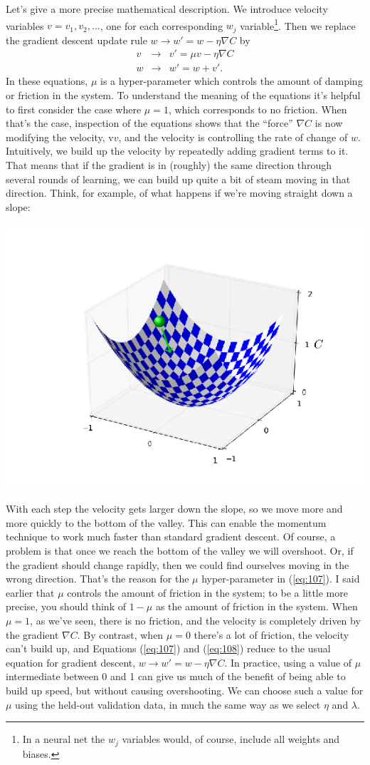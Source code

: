 \documentclass[a4paper,twoside,10pt]{book}
\begin{document}
Let's give a more precise mathematical description. We introduce velocity variables $v=v_1,v_2,\ldots$, one for each corresponding $w_j$ variable\footnote{In a neural net the $w_j$ variables would, of course, include all weights and biases.}. Then we replace the gradient descent update rule $w \to w'= w-\eta \nabla C$ by
\begin{eqnarray} 
v & \to  & v' = \mu v - \eta \nabla C \label{eq:107}\\
w & \to & w' = w+v'.\label{eq:108}
\end{eqnarray}
In these equations, $\mu$ is a hyper-parameter which controls the amount of damping or friction in the system. To understand the meaning of the equations it's helpful to first consider the case where $\mu=1$, which corresponds to no friction. When that's the case, inspection of the equations shows that the ``force'' $\nabla C$ is now modifying the velocity, v$v$, and the velocity is controlling the rate of change of $w$. Intuitively, we build up the velocity by repeatedly adding gradient terms to it. That means that if the gradient is in (roughly) the same direction through several rounds of learning, we can build up quite a bit of steam moving in that direction. Think, for example, of what happens if we're moving straight down a slope:
\begin{center}
	\includegraphics[width=0.55\linewidth]{figures/ch3/tikz34}
\end{center}
With each step the velocity gets larger down the slope, so we move more and more quickly to the bottom of the valley. This can enable the momentum technique to work much faster than standard gradient descent. Of course, a problem is that once we reach the bottom of the valley we will overshoot. Or, if the gradient should change rapidly, then we could find ourselves moving in the wrong direction. That's the reason for the $\mu$ hyper-parameter in (\ref{eq:107}). I said earlier that $\mu$ controls the amount of friction in the system; to be a little more precise, you should think of $1-\mu$ as the amount of friction in the system. When $\mu=1$, as we've seen, there is no friction, and the velocity is completely driven by the gradient $\nabla C$. By contrast, when $\mu=0$ there's a lot of friction, the velocity can't build up, and Equations (\ref{eq:107}) and (\ref{eq:108}) reduce to the usual equation for gradient descent, $w \to w'=w-\eta \nabla C$. In practice, using a value of $\mu$ intermediate between 0 and 1 can give us much of the benefit of being able to build up speed, but without causing overshooting. We can choose such a value for $\mu$ using the held-out validation data, in much the same way as we select $\eta$ and $\lambda$.
\end{document}
